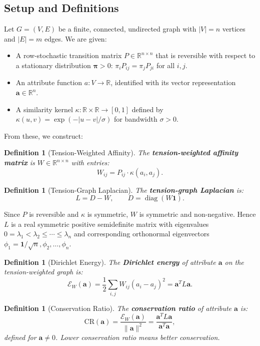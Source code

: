 \documentclass[12pt,letterpaper]{article}
\newtheorem{definition}[theorem]{Definition}
\newcommand{\R}{\mathbb{R}}
\newcommand{\One}{\mathbf{1}}
\newcommand{\bfa}{\mathbf{a}}
\newcommand{\bfpi}{\boldsymbol{\pi}}
\newcommand{\CR}{\mathrm{CR}}
\newcommand{\diag}{\operatorname{diag}}
\newcommand{\cE}{\mathcal{E}}
\begin{document}
\subsection{Setup and Definitions}
\label{sec:setup}

Let $G = (V, E)$ be a finite, connected, undirected graph with $|V| = n$ vertices and $|E| = m$ edges. We are given:

\begin{itemize}
  \item A row-stochastic transition matrix $P \in \R^{n \times n}$ that is reversible with respect to a stationary distribution $\bfpi > 0$: $\pi_i P_{ij} = \pi_j P_{ji}$ for all $i, j$.
  \item An attribute function $a : V \to \R$, identified with its vector representation $\bfa \in \R^n$.
  \item A similarity kernel $\kappa : \R \times \R \to [0,1]$ defined by $\kappa(u,v) = \exp(-|u - v|/\sigma)$ for bandwidth $\sigma > 0$.
\end{itemize}

From these, we construct:

\begin{definition}[Tension-Weighted Affinity]
\label{def:tension-weight}
The \textbf{tension-weighted affinity matrix} is $W \in \R^{n \times n}$ with entries:
\[
  W_{ij} = P_{ij} \cdot \kappa(a_i, a_j).
\]
\end{definition}

\begin{definition}[Tension-Graph Laplacian]
\label{def:tension-laplacian}
The \textbf{tension-graph Laplacian} is:
\[
  L = D - W, \qquad D = \diag(W\One).
\]
\end{definition}

Since $P$ is reversible and $\kappa$ is symmetric, $W$ is symmetric and non-negative. Hence $L$ is a real symmetric positive semidefinite matrix with eigenvalues $0 = \lambda_1 < \lambda_2 \leq \cdots \leq \lambda_n$ and corresponding orthonormal eigenvectors $\phi_1 = \One/\sqrt{n}, \phi_2, \ldots, \phi_n$.

\begin{definition}[Dirichlet Energy]
\label{def:dirichlet}
The \textbf{Dirichlet energy} of attribute $\bfa$ on the tension-weighted graph is:
\[
  \cE_W(\bfa) = \frac{1}{2}\sum_{i,j} W_{ij}(a_i - a_j)^2 = \bfa^T L \bfa.
\]
\end{definition}

\begin{definition}[Conservation Ratio]
\label{def:cr}
The \textbf{conservation ratio} of attribute $\bfa$ is:
\[
  \CR(\bfa) = \frac{\cE_W(\bfa)}{\|\bfa\|^2} = \frac{\bfa^T L \bfa}{\bfa^T \bfa},
\]
defined for $\bfa \neq 0$. Lower conservation ratio means better conservation.
\end{definition}
\end{document}
